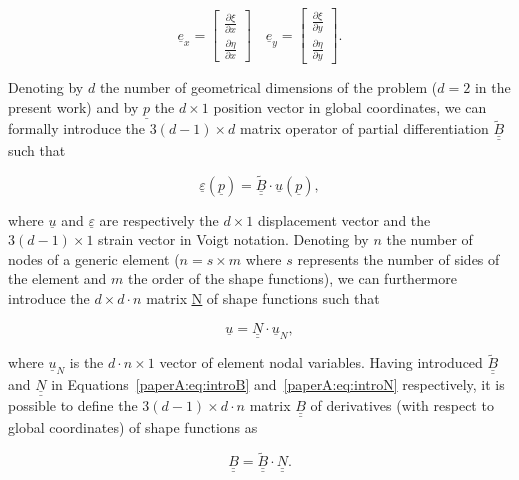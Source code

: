 \begin{equation}
\underline{e}_{x}=\begin{bmatrix}
\frac{\partial \xi}{\partial x}\\\frac{\partial \eta}{\partial x}
\end{bmatrix}\quad\underline{e}_{y}=\begin{bmatrix}
\frac{\partial \xi}{\partial y}\\\frac{\partial \eta}{\partial y}
\end{bmatrix}.
\end{equation}

Denoting by $d$ the number of geometrical dimensions of the problem ($d=2$ in the present work) and by $\underline{p}$ the $d\times 1$ position vector in global coordinates, we can formally introduce the $3\left(d-1\right)\times d$ matrix operator of partial differentiation $\underline{\underline{\widetilde{B}}}$ such that

\begin{equation}\label{paperA:eq:introB}
\underline{\varepsilon}\left(\underline{p}\right)=\underline{\underline{\widetilde{B}}}\cdot\underline{u}\left(\underline{p}\right),
\end{equation}

where $\underline{u}$ and $\underline{\varepsilon}$ are respectively the $d\times 1$ displacement vector and the $3\left(d-1\right)\times 1$ strain vector in Voigt notation. Denoting by $n$ the number of nodes of a generic element ($n=s\times m$ where $s$ represents the number of sides of the element and $m$ the order of the shape functions), we can furthermore introduce the $d\times d\cdot n$ matrix \underline{\underline{N}} of shape functions such that

\begin{equation}\label{paperA:eq:introN}
\underline{u}=\underline{\underline{N}}\cdot\underline{u}_{N},
\end{equation}

where $\underline{u}_{N}$ is the $d\cdot n\times 1$ vector of element nodal variables. Having introduced $\underline{\underline{\widetilde{B}}}$ and $\underline{\underline{N}}$ in Equations~\ref{paperA:eq:introB} and~\ref{paperA:eq:introN} respectively, it is possible to define the $3\left(d-1\right)\times d\cdot n$ matrix $\underline{\underline{B}}$ of derivatives (with respect to global coordinates) of shape functions as

\begin{equation}
\underline{\underline{B}}=\underline{\underline{\widetilde{B}}}\cdot\underline{\underline{N}}.
\end{equation}

